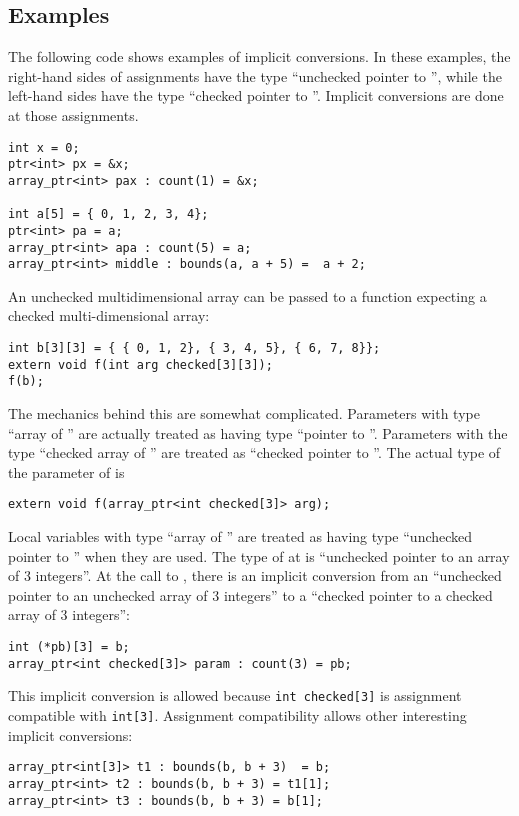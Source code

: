 \subsection{Examples}

The following code shows examples of implicit conversions.  In these examples,
the right-hand sides of assignments have the type ``unchecked pointer to
'', while the left-hand sides have the type ``checked pointer to
''.  Implicit conversions are done at those assignments.
\begin{lstlisting}
int x = 0;
ptr<int> px = &x;
array_ptr<int> pax : count(1) = &x;

int a[5] = { 0, 1, 2, 3, 4};
ptr<int> pa = a;
array_ptr<int> apa : count(5) = a;
array_ptr<int> middle : bounds(a, a + 5) =  a + 2;
\end{lstlisting}

An unchecked multidimensional array can be passed to a function expecting
a checked multi-dimensional array:
\begin{lstlisting}
int b[3][3] = { { 0, 1, 2}, { 3, 4, 5}, { 6, 7, 8}};
extern void f(int arg checked[3][3]);
f(b);
\end{lstlisting}

The mechanics behind this are somewhat complicated.  Parameters with type
``array of '' are actually treated as having type ``pointer to ''.
Parameters with the type ``checked array of '' are treated as ``checked
pointer to ''.  The actual type of the parameter of  is
\begin{lstlisting}
extern void f(array_ptr<int checked[3]> arg);
\end{lstlisting}
Local variables with type ``array of '' are treated as having
type ``unchecked pointer to '' when they are used.  The type of
 at  is ``unchecked pointer to an array of 3 integers''.
At the call to  , there is an implicit conversion from an
``unchecked pointer to an unchecked array of 3 integers'' to a ``checked pointer
to a checked array of 3 integers'':
\begin{lstlisting}
int (*pb)[3] = b;
array_ptr<int checked[3]> param : count(3) = pb;
\end{lstlisting}
This implicit conversion is allowed because \lstinline|int checked[3]| is assignment
compatible with \lstinline|int[3]|.  Assignment compatibility allows other
interesting implicit conversions:
\begin{lstlisting}
array_ptr<int[3]> t1 : bounds(b, b + 3)  = b;
array_ptr<int> t2 : bounds(b, b + 3) = t1[1];
array_ptr<int> t3 : bounds(b, b + 3) = b[1];
\end{lstlisting}

